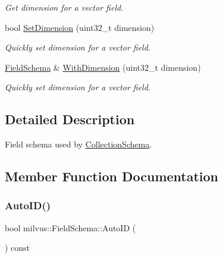 \begin{DoxyCompactItemize}
\begin{DoxyCompactList}\small\item\em Get dimension for a vector field. \end{DoxyCompactList}\item 
\mbox{\label{classmilvus_1_1_field_schema_a814d15d24fbf01b281168affdc2419a6}} 
bool \hyperlink{classmilvus_1_1_field_schema_a814d15d24fbf01b281168affdc2419a6}{Set\+Dimension} (uint32\+\_\+t dimension)
\begin{DoxyCompactList}\small\item\em Quickly set dimension for a vector field. \end{DoxyCompactList}\item 
\mbox{\label{classmilvus_1_1_field_schema_a2c127175f2b3481b0b952273618e7b71}} 
\hyperlink{classmilvus_1_1_field_schema}{Field\+Schema} \& \hyperlink{classmilvus_1_1_field_schema_a2c127175f2b3481b0b952273618e7b71}{With\+Dimension} (uint32\+\_\+t dimension)
\begin{DoxyCompactList}\small\item\em Quickly set dimension for a vector field. \end{DoxyCompactList}\end{DoxyCompactItemize}


\subsection{Detailed Description}
Field schema used by \hyperlink{classmilvus_1_1_collection_schema}{Collection\+Schema}. 

\subsection{Member Function Documentation}
\mbox{\label{classmilvus_1_1_field_schema_ae18e54e3d2c90e10a1abdd7426743e75}} 
\subsubsection{\texorpdfstring{Auto\+I\+D()}{AutoID()}}
{\footnotesize\ttfamily bool milvus\+::\+Field\+Schema\+::\+Auto\+ID (\begin{DoxyParamCaption}{ }\end{DoxyParamCaption}) const\hspace{0.3cm}{\ttfamily [inline]}}




